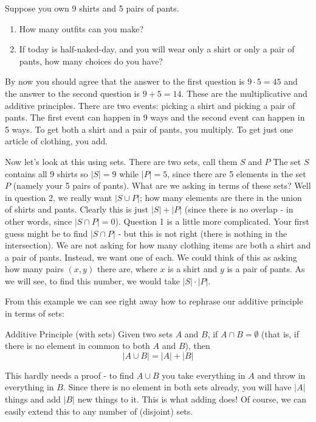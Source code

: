 \documentclass[12pt]{article}
\begin{document}
\begin{example}
 Suppose you own 9 shirts and 5 pairs of pants.
 \begin{enumerate}
  \item How many outfits can you make?
  \item If today is half-naked-day, and you will wear only a shirt or only a pair of pants, how many choices do you have?
 \end{enumerate}
\begin{solution}
 By now you should agree that the answer to the first question is $9 \cdot 5 = 45$ and the answer to the second question is $9 + 5 = 14$.  These are the multiplicative and additive principles.  There are two events: picking a shirt and picking a pair of pants.  The first event can happen in 9 ways and the second event can happen in 5 ways.  To get both a shirt and a pair of pants, you multiply.  To get just one article of clothing, you add.
 
 Now let's look at this using sets.  There are two sets, call them $S$ and $P$  The set $S$ contains all 9 shirts so $|S| = 9$ while $|P| = 5$, since there are 5 elements in the set $P$ (namely your 5 pairs of pants).  What are we asking in terms of these sets?  Well in question 2, we really want $|S \cup P|$; how many elements are there in the union of shirts and pants.  Clearly this is just $|S| + |P|$ (since there is no overlap - in other words, since $|S \cap P| = 0$).  Question 1 is a little more complicated.  Your first guess might be to find $|S \cap P|$ - but this is not right (there is nothing in the intersection).  We are not asking for how many clothing items are both a shirt and a pair of pants.  Instead, we want one of each.  We could think of this as asking how many pairs $(x,y)$ there are, where $x$ is a shirt and $y$ is a pair of pants.  As we will see, to find this number, we would take $|S| \cdot |P|$.
\end{solution}
\end{example}

From this example we can see right away how to rephrase our additive principle in terms of sets:

\begin{defbox}{Additive Principle (with sets)}
Given two sets $A$ and $B$, if $A \cap B = \emptyset$ (that is, if there is no element in common to both $A$ and $B$), then
\[|A \cup B| = |A| + |B|\]
\end{defbox}

This hardly needs a proof - to find $A \cup B$ you take everything in $A$ and throw in everything in $B$.  Since there is no element in both sets already, you will have $|A|$ things and add $|B|$ new things to it.  This is what adding does!  Of course, we can easily extend this to any number of (disjoint) sets.
\end{document}
